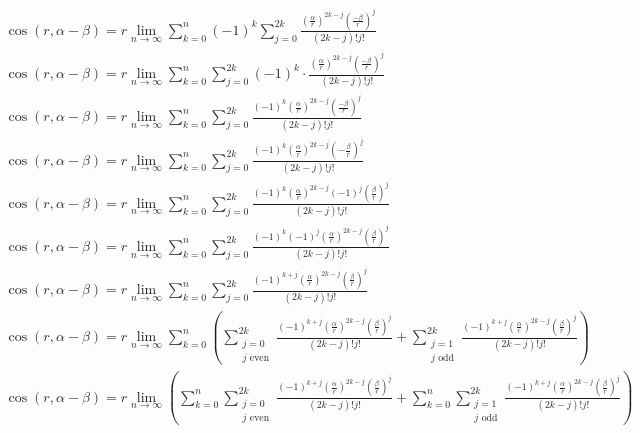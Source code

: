 \documentclass[a4paper,12pt]{report}
\begin{document}
\begin{landscape}
{\begin{gather}
\cos(r,\alpha - \beta) = r \lim \limits_{n \to \infty} \sum \limits_{k=0}^{n} (-1)^k \sum \limits_{j=0}^{2k} \frac{\left(\frac{\alpha}{r}\right)^{2k-j} \left(\frac{-\beta}{r}\right)^j}{(2k-j)! j!} \\
\cos(r,\alpha - \beta) = r \lim \limits_{n \to \infty} \sum \limits_{k=0}^{n} \sum \limits_{j=0}^{2k} (-1)^k \cdot \frac{\left(\frac{\alpha}{r}\right)^{2k-j} \left(\frac{-\beta}{r}\right)^j}{(2k-j)! j!} \\
\cos(r,\alpha - \beta) = r \lim \limits_{n \to \infty} \sum \limits_{k=0}^{n} \sum \limits_{j=0}^{2k} \frac{(-1)^k \left(\frac{\alpha}{r}\right)^{2k-j} \left(\frac{-\beta}{r}\right)^j}{(2k-j)! j!} \\
\cos(r,\alpha - \beta) = r \lim \limits_{n \to \infty} \sum \limits_{k=0}^{n} \sum \limits_{j=0}^{2k} \frac{(-1)^k \left(\frac{\alpha}{r}\right)^{2k-j} \left(-\frac{\beta}{r}\right)^j}{(2k-j)! j!} \\
\cos(r,\alpha - \beta) = r \lim \limits_{n \to \infty} \sum \limits_{k=0}^{n} \sum \limits_{j=0}^{2k} \frac{(-1)^k \left(\frac{\alpha}{r}\right)^{2k-j} (-1)^j \left(\frac{\beta}{r}\right)^j}{(2k-j)! j!} \\
\cos(r,\alpha - \beta) = r \lim \limits_{n \to \infty} \sum \limits_{k=0}^{n} \sum \limits_{j=0}^{2k} \frac{(-1)^k (-1)^j \left(\frac{\alpha}{r}\right)^{2k-j} \left(\frac{\beta}{r}\right)^j}{(2k-j)! j!} \\
\cos(r,\alpha - \beta) = r \lim \limits_{n \to \infty} \sum \limits_{k=0}^{n} \sum \limits_{j=0}^{2k} \frac{(-1)^{k+j} \left(\frac{\alpha}{r}\right)^{2k-j} \left(\frac{\beta}{r}\right)^j}{(2k-j)! j!} \\
\cos(r,\alpha - \beta) = r \lim \limits_{n \to \infty} \sum \limits_{k=0}^{n} \left(\sum \limits_{\substack{j=0 \\ j \text{ even}}}^{2k} \frac{(-1)^{k+j} \left(\frac{\alpha}{r}\right)^{2k-j} \left(\frac{\beta}{r}\right)^j}{(2k-j)! j!} + \sum \limits_{\substack{j=1 \\ j \text{ odd}}}^{2k} \frac{(-1)^{k+j} \left(\frac{\alpha}{r}\right)^{2k-j} \left(\frac{\beta}{r}\right)^j}{(2k-j)! j!}\right) \\
\cos(r,\alpha - \beta) = r \lim \limits_{n \to \infty} \left(\sum \limits_{k=0}^{n} \sum \limits_{\substack{j=0 \\ j \text{ even}}}^{2k} \frac{(-1)^{k+j} \left(\frac{\alpha}{r}\right)^{2k-j} \left(\frac{\beta}{r}\right)^j}{(2k-j)! j!} + \sum \limits_{k=0}^{n} \sum \limits_{\substack{j=1 \\ j \text{ odd}}}^{2k} \frac{(-1)^{k+j} \left(\frac{\alpha}{r}\right)^{2k-j} \left(\frac{\beta}{r}\right)^j}{(2k-j)! j!}\right) \\

\end{gather}}
\end{landscape}
\end{document}
